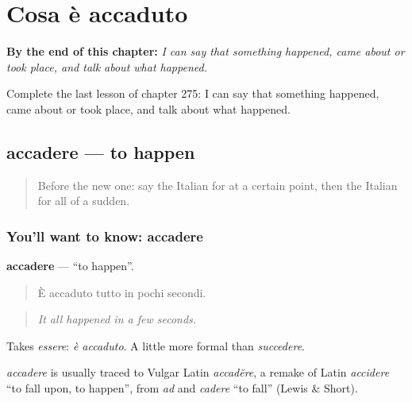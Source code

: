 
\chapter{Cosa è accaduto}
\label{ch:it-cosa-e-accaduto}

\begin{chapteropening}
\textbf{By the end of this chapter:} \emph{I can say that something happened, came about or took place, and talk about what happened.}

Complete the last lesson of chapter 275: I can say that something happened, came about or took place, and talk about what happened.
\end{chapteropening}

\section[accadere]{accadere — to happen}

\label{lesson:IT-C275-accadere}



\begin{quote}
Before the new one: say the Italian for at a certain point, then the Italian for all of a sudden.
\end{quote}

\subsection*{You'll want to know: accadere}
\textbf{accadere} — \textquotedblleft{}to happen\textquotedblright{}.

\begin{quote}
È accaduto tutto in pochi secondi.
\end{quote}

\begin{quote}
\emph{It all happened in a few seconds.}
\end{quote}

Takes \emph{essere}: \emph{è accaduto}. A little more formal than \emph{succedere}.

\begin{cousinweb}
\emph{accadere} is usually traced to Vulgar Latin \emph{accadĕre}, a remake of Latin \emph{accidere} \textquotedblleft{}to fall upon, to happen\textquotedblright{}, from \emph{ad} and \emph{cadere} \textquotedblleft{}to fall\textquotedblright{} (Lewis \& Short).
\end{cousinweb}

